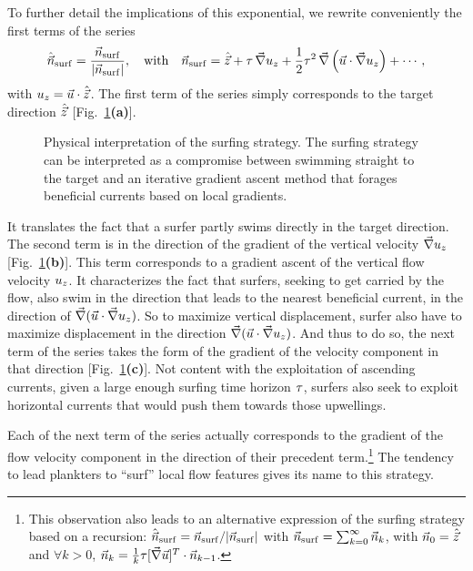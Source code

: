 To further detail the implications of this exponential, we rewrite conveniently the first terms of the series
\begin{equation}
	\hat{\vec{n}}_{\mathrm{surf}} = \frac{\vec{n}_{\mathrm{surf}}}{\lvert\vec{n}_{\mathrm{surf}}\rvert}, \quad \text{with} \quad 
	\vec{n}_{\mathrm{surf}} = \hat{\vec{z}} + \tau \, \vec{\nabla} u_z + \frac{1}{2} \tau^2 \, \vec{\nabla} \left( \vec{u} \cdot \vec{\nabla} u_z \right) + \dotsb,
\end{equation}
with $u_z = \vec{u} \cdot \hat{\vec{z}}$.
The first term of the series simply corresponds to the target direction $\hat{\vec{z}}$ [Fig.~\ref{fig:physical_interpretation}\textbf{(a)}].
\begin{figure}%
	\centering
	\def\svgwidth{\textwidth}
	
	\caption[Physical interpretation of the surfing strategy.]{
		Physical interpretation of the surfing strategy. The surfing strategy can be interpreted as a compromise between swimming straight to the target and an iterative gradient ascent method that forages beneficial currents based on local gradients.
	}
	\label{fig:physical_interpretation}
\end{figure}
It translates the fact that a surfer partly swims directly in the target direction.
The second term is in the direction of the gradient of the vertical velocity $\vec{\nabla} u_z$ [Fig.~\ref{fig:physical_interpretation}\textbf{(b)}]. 
This term corresponds to a gradient ascent of the vertical flow velocity $u_z$.
It characterizes the fact that surfers, seeking to get carried by the flow, also swim in the direction that leads to the nearest beneficial current, in the direction of $\vec{\nabla} ( \vec{u} \cdot \vec{\nabla} u_z )$.
So to maximize vertical displacement, surfer also have to maximize displacement in the direction $\vec{\nabla} ( \vec{u} \cdot \vec{\nabla} u_z )$.
And thus to do so, the next term of the series takes the form of the gradient of the velocity component in that direction [Fig.~\ref{fig:physical_interpretation}\textbf{(c)}].
Not content with the exploitation of ascending currents, given a large enough surfing time horizon $\tau$, surfers also seek to exploit horizontal currents that would push them towards those upwellings.

Each of the next term of the series actually corresponds to the gradient of the flow velocity component in the direction of their precedent term.\footnote{This observation also leads to an alternative expression of the surfing strategy based on a recursion:
$\hat{\vec{n}}_{\mathrm{surf}} = \vec{n}_{\mathrm{surf}}/\lvert\vec{n}_{\mathrm{surf}}\rvert$ with $\vec{n}_{\mathrm{surf}} = \sum_{k = 0}^{\infty} \vec{n}_{k}$, with $\vec{n}_{0} = \hat{\vec{z}}$ and $\forall k > 0$, $\vec{n}_{k} = \frac{1}{k} \tau [ \vec{\nabla} \vec{u} ]^T \cdot \vec{n}_{k-1}$.}
The tendency to lead plankters to ``surf'' local flow features gives its name to this strategy.


